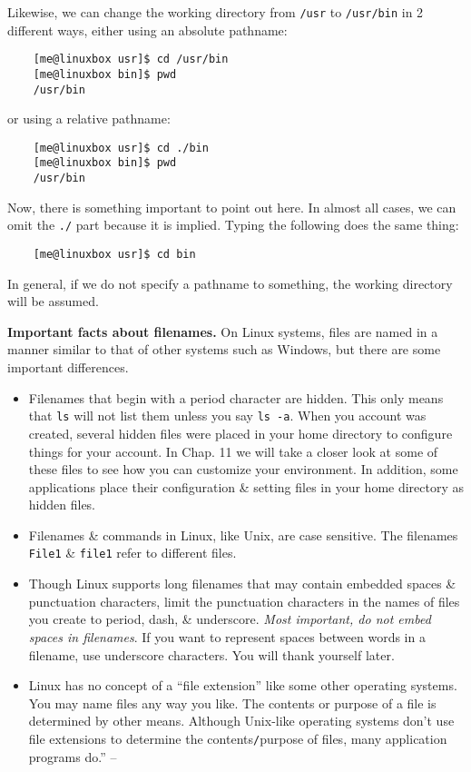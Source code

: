 \documentclass[oneside]{book}
\numberwithin{equation}{section}
\begin{document}
Likewise, we can change the working directory from \texttt{/usr} to \texttt{/usr/bin} in 2 different ways, either using an absolute pathname:
\begin{verbatim}
	[me@linuxbox usr]$ cd /usr/bin
	[me@linuxbox bin]$ pwd
	/usr/bin
\end{verbatim}
or using a relative pathname:
\begin{verbatim}
	[me@linuxbox usr]$ cd ./bin
	[me@linuxbox bin]$ pwd
	/usr/bin
\end{verbatim}
Now, there is something important to point out here. In almost all cases, we can omit the \texttt{./} part because it is implied. Typing the following does the same thing:
\begin{verbatim}
	[me@linuxbox usr]$ cd bin
\end{verbatim}
In general, if we do not specify a pathname to something, the working directory will be assumed.

\textbf{Important facts about filenames.} On Linux systems, files are named in a manner similar to that of other systems such as Windows, but there are some important differences.
\begin{itemize}
	\item Filenames that begin with a period character are hidden. This only means that \texttt{ls} will not list them unless you say \texttt{ls -a}. When you account was created, several hidden files were placed in your home directory to configure things for your account. In Chap. 11 we will take a closer look at some of these files to see how you can customize your environment. In addition, some applications place their configuration \& setting files in your home directory as hidden files.
	\item Filenames \& commands in Linux, like Unix, are case sensitive. The filenames \texttt{File1} \& \texttt{file1} refer to different files.
	\item Though Linux supports long filenames that may contain embedded spaces \& punctuation characters, limit the punctuation characters in the names of files you create to period, dash, \& underscore. \textit{Most important, do not embed spaces in filenames}. If you want to represent spaces between words in a filename, use underscore characters. You will thank yourself later.
	\item Linux has no concept of a ``file extension'' like some other operating systems. You may name files any way you like. The contents or purpose of a file is determined by other means. Although Unix-like operating systems don't use file extensions to determine the contents\texttt{/}purpose of files, many application programs do.'' -- \cite[pp. 46--48]{Shotts2019}
\end{itemize}
\end{document}
